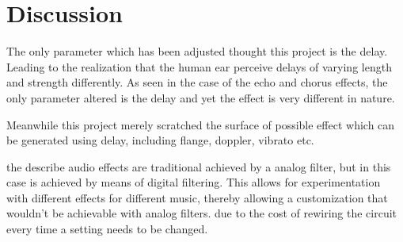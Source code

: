 \clearpage
\section{Discussion}
The only parameter which has been adjusted thought this project is the delay. Leading to the realization that the human ear perceive delays of varying length and strength differently. As seen in the case of the echo and chorus effects, the only parameter altered is the delay and yet the effect is very different in nature.

Meanwhile this project merely scratched the surface of possible effect which can be generated using delay, including flange, doppler, vibrato etc.     

 

the describe audio effects are traditional achieved by a analog filter, but in this case is achieved by means of digital filtering.
This allows for experimentation with different effects for different music, thereby allowing a customization that wouldn't be achievable with analog filters.
due to the cost of rewiring the circuit every time a setting needs to be changed.

